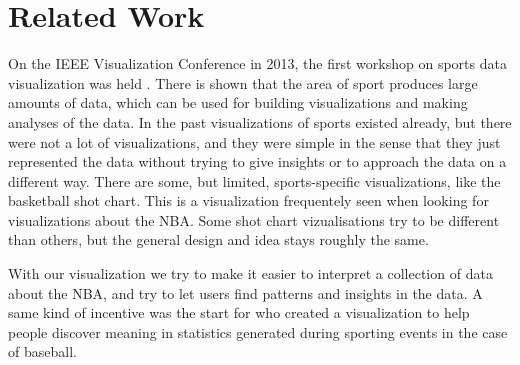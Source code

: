\documentclass{sigchi}
\begin{document}
\section{Related Work}\label{sec:literature}

On the IEEE Visualization Conference in 2013, the first workshop on sports data
visualization was held \cite{ieeevis}. There is shown that the area of sport
produces large amounts of data, which can be used for building visualizations
and making analyses of the data. In the past visualizations of sports existed
already, but there were not a lot of visualizations, and they were simple in
the sense that they just represented the data without trying to give insights
or to approach the data on a different way. There are some, but limited,
sports-specific visualizations, like the basketball shot chart. This is a
visualization frequentely seen when looking for visualizations about the NBA.
Some shot chart vizualisations try to be different than others, but the general
design and idea stays roughly the same. 

With our visualization we try to make it easier to interpret a collection of
data about the NBA, and try to let users find patterns and insights in the
data. A same kind of incentive was the start for \cite{cox2006sportsvis} who
created a visualization to help people discover meaning in statistics generated
during sporting events in the case of baseball.





\end{document}

